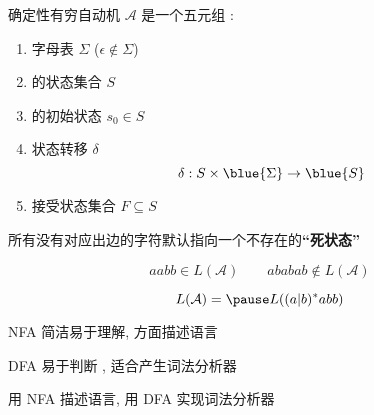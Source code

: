 \begin{frame}{}
  \begin{definition}
    确定性有穷自动机 $\mathcal{A}$ 是一个五元组 
    :

    \vspace{0.30cm}
    \begin{enumerate}[(1)]
      \item 字母表 $\Sigma$ ($\epsilon \notin \Sigma$)
      \item {}的状态集合 $S$
      \item {}的初始状态 $s_{0} \in S$
      \item 状态转移 $\delta$
        \[
          \delta: S \times \blue{\Sigma} \to \blue{S}
        \]
      \item 接受状态集合 $F \subseteq S$
    \end{enumerate}
  \end{definition}


  \pause
  \begin{center}
     所有没有对应出边的字符默认指向一个不存在的{\bf ``死状态''}
  \end{center}
\end{frame}

\begin{frame}{}

  \[
    aabb \in L(\mathcal{A}) \qquad ababab \notin L(\mathcal{A})
  \]

  \pause
  \[
    L(\mathcal{A}) = \pause L((a|b)^{\ast}abb)
  \]

  \pause
\end{frame}

\begin{frame}{}
  \begin{center}
    NFA 简洁易于理解, 方面描述语言 

    \vspace{0.30cm}
    DFA 易于判断 , 适合产生词法分析器 

    \pause
    \vspace{1.20cm}
    用 NFA 描述语言, 用 DFA 实现词法分析器

    \vspace{0.30cm}
  \end{center}
\end{frame}

